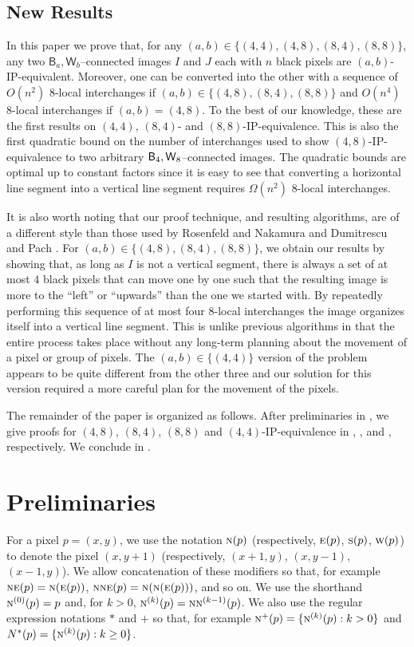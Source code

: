 \documentclass[lotsofwhite,charterfonts]{patmorin}
\newcommand{\foureight}{\ensuremath{\protect\textup{\textsf{B}}_{4},\protect\textup{\textsf{W}}_{8}}}
\newcommand{\N}{\textsc{n}}
\newcommand{\NE}{\textsc{ne}}
\newcommand{\E}{\textsc{e}}
\renewcommand{\S}{\textsc{s}}
\newcommand{\W}{\textsc{w}}
\begin{document}
\subsection{New Results}

In this paper we prove that, for any $(a,b)\in\{(4,4),(4,8),(8,4),(8,8)\}$,
any two $\textsf{B}_a,\textsf{W}_b$--connected images $I$ and $J$ each with $n$ black pixels are $(a,b)$-IP-equivalent. Moreover, one can be converted into the other with a sequence of $O(n^2)$ 8-local interchanges if $(a,b)\in\{(4,8),(8,4),(8,8)\}$ and $O(n^4)$ 8-local interchanges if $(a,b)=(4,8)$. To the best of
our knowledge, these are the first results on $(4,4)$, $(8,4)$- and
$(8,8)$-IP-equivalence. This is also the first quadratic bound on the
number of interchanges used to show $(4,8)$-IP-equivalence to two
arbitrary \foureight--connected images.  The quadratic bounds are optimal up to
constant factors since it is easy to see that converting a horizontal
line segment into a vertical line segment requires $\Omega(n^2)$
8-local interchanges.

It is also worth noting that our proof technique, and resulting
algorithms, are of a different style than those used by Rosenfeld and
Nakamura \cite{rn02} and Dumitrescu and Pach \cite{dp04}. For $(a,b)\in\{(4,8),(8,4),(8,8)\}$, we obtain
our results by showing that, as long as $I$ is not a vertical segment, there is always a set of at most $4$ black pixels that can move one by one such that the resulting image is more to the ``left'' or ``upwards'' than the one we started with. By repeatedly performing this sequence of at most four $8$-local interchanges the image organizes itself into a vertical line segment.  This is unlike
previous algorithms \cite{dp04,rn02} in that the entire process takes
place without any long-term planning about the movement of a pixel or
group of pixels. The $(a,b)\in\{(4,4)\}$ version of the problem appears to be quite different from the other three and our solution for this version required a more careful plan for the movement of the pixels. 

The remainder of the paper is organized as follows. After preliminaries in , we give proofs for $(4,8)$, $(8,4)$, $(8,8)$ and $(4,4)$-IP-equivalence in , ,  and , respectively. We conclude in .



\section{Preliminaries}
For a pixel $p=(x,y)$, we use the notation $\N(p)$ (respectively,
$\E(p)$, $\S(p)$, $\W(p)$) to denote the pixel $(x,y+1)$
(respectively, $(x+1,y)$, $(x,y-1)$, $(x-1,y)$).  We allow
concatenation of these modifiers so that, for example
$\NE(p)=\N(\E(p))$, $\N\NE(p)=\N(\N(\E(p)))$, and so on.  We use the
shorthand $\N^{(0)}(p)=p$ and, for $k>0$,
$\N^{(k)}(p)=\N\N^{(k-1)}(p)$.  We also use the regular expression
notations $*$ and $+$ so that, for example $\N^+(p)=\{\N^{(k)}(p):
k>0\}$ and $N^*(p)=\{\N^{(k)}(p): k\ge 0\}$.
 
\end{document}
